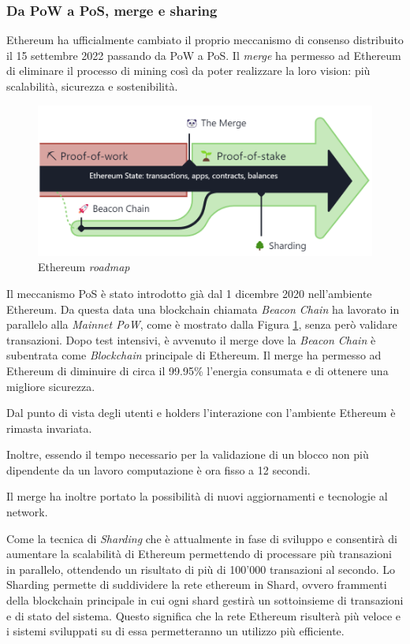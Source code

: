 \subsubsection{Da PoW a PoS, merge e sharing}
Ethereum ha ufficialmente cambiato il proprio meccanismo di consenso distribuito il 15 settembre 2022 passando da PoW a PoS.
Il \textit{merge} ha permesso ad Ethereum di eliminare il processo di mining così da poter realizzare la loro vision: più scalabilità, sicurezza e sostenibilità. \cite{ethereum-vision}

\begin{figure}[ht]
    \centering
    \includegraphics[scale=0.5]{images/ethereum-merge}
    \caption{Ethereum \emph{roadmap}}
    \label{fig:ethereum-roadmap}
\end{figure}

Il meccanismo PoS è stato introdotto già dal 1 dicembre 2020 nell'ambiente Ethereum.
Da questa data una blockchain chiamata \textit{Beacon Chain} ha lavorato in parallelo alla \textit{Mainnet PoW}, come è mostrato dalla Figura \ref{fig:ethereum-roadmap}, senza però validare transazioni.\cite{ethereum-pos} Dopo test intensivi, è avvenuto il merge dove la \textit{Beacon Chain} è subentrata come \textit{Blockchain} principale di Ethereum.
Il merge ha permesso ad Ethereum di diminuire di circa il 99.95\% l'energia consumata e di ottenere una migliore sicurezza. \cite{ethereum-merge}

Dal punto di vista degli utenti e holders l'interazione con l'ambiente Ethereum è rimasta invariata. 

Inoltre, essendo il tempo necessario per la validazione di un blocco non più dipendente da un lavoro computazione è ora fisso a 12 secondi. \cite{ethereum-merge} 

Il merge ha inoltre portato la possibilità di nuovi aggiornamenti e tecnologie al network.

Come la tecnica di \textit{Sharding} che è attualmente in fase di sviluppo e consentirà di aumentare la scalabilità di Ethereum permettendo di processare più transazioni in parallelo, ottendendo un risultato di più di 100'000 transazioni al secondo.
Lo Sharding permette di suddividere la rete ethereum in Shard, ovvero frammenti della blockchain principale in cui ogni shard gestirà un sottoinsieme di transazioni e di stato del sistema. Questo significa che la rete Ethereum risulterà più veloce e i sistemi sviluppati su di essa permetteranno un utilizzo più efficiente. \cite{ethereum-sharding}

